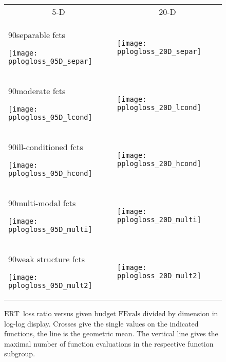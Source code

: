 \documentclass{article}
\newcommand{\ERT}{\ensuremath{\mathrm{ERT}}}
\newcommand{\FEvals}{\ensuremath{\mathrm{FEvals}}}
\newcommand{\rot}[2][2.5]{
  \hspace*{-3.5\baselineskip}%
  \begin{rotate}{90}\hspace{#1em}#2
  \end{rotate}}
\begin{document}
\begin{figure}[htbp!]
\centering
\begin{tabular}{@{}ll@{}}
\multicolumn{1}{c}{5-D} & \multicolumn{1}{c}{20-D}\\
\rot{separable fcts}
\texttt{[image: pplogloss\_05D\_separ]} &
\texttt{[image: pplogloss\_20D\_separ]}\\[-2ex]
\rot[2]{moderate fcts}
\texttt{[image: pplogloss\_05D\_lcond]} &
\texttt{[image: pplogloss\_20D\_lcond]}\\[-2ex]
\rot[1.3]{ill-conditioned fcts}
\texttt{[image: pplogloss\_05D\_hcond]} &
\texttt{[image: pplogloss\_20D\_hcond]}\\[-2ex]
\rot[1.6]{multi-modal fcts}
\texttt{[image: pplogloss\_05D\_multi]} &
\texttt{[image: pplogloss\_20D\_multi]}\\[-2ex]
\rot[1.0]{weak structure fcts}
\texttt{[image: pplogloss\_05D\_mult2]} &
\texttt{[image: pplogloss\_20D\_mult2]}
\vspace*{-1ex}
\end{tabular}
\caption{\label{fig:ERTloglossb\algfolder}\ERT\ loss ratio versus given budget
$\FEvals$ divided by dimension in log-log display. Crosses give
the single values on the indicated functions, the line is the geometric mean.
The vertical line gives the maximal number of function evaluations in the
respective function subgroup.}
\end{figure}
\end{document}
